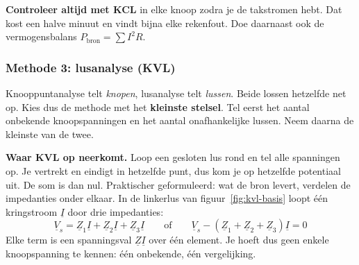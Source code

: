 \documentclass[a4paper,11pt]{article}
\begin{document}
\begin{examenbox}
    \textbf{Controleer altijd met KCL} in elke knoop zodra je de takstromen hebt. Dat kost een
    halve minuut en vindt bijna elke rekenfout. Doe daarnaast ook de vermogensbalans
    $P_{\text{bron}} = \sum I^2R$.
\end{examenbox}

\subsubsection{Methode 3: lusanalyse (KVL)}

Knooppuntanalyse telt \emph{knopen}, lusanalyse telt \emph{lussen}. Beide lossen hetzelfde net op.
Kies dus de methode met het \textbf{kleinste stelsel}. Tel eerst het aantal onbekende
knoopspanningen en het aantal onafhankelijke lussen. Neem daarna de kleinste van de twee.

\textbf{Waar KVL op neerkomt.} Loop een gesloten lus rond en tel alle spanningen op. Je vertrekt en
eindigt in hetzelfde punt, dus kom je op hetzelfde potentiaal uit. De som is dan nul. Praktischer
geformuleerd: wat de bron levert, verdelen de impedanties onder elkaar. In de linkerlus van
figuur~\ref{fig:kvl-basis} loopt \'e\'en kringstroom $\underline{I}$ door drie impedanties:
\[\underline{V}_s = \underline{Z}_1\underline{I} + \underline{Z}_2\underline{I} + \underline{Z}_3\underline{I}
    \qquad\text{of}\qquad
    \underline{V}_s - (\underline{Z}_1 + \underline{Z}_2 + \underline{Z}_3)\underline{I} = 0\]
Elke term is een spanningsval $\underline{Z}\underline{I}$ over \'e\'en element. Je hoeft dus geen
enkele knoopspanning te kennen: \'e\'en onbekende, \'e\'en vergelijking.
\end{document}
